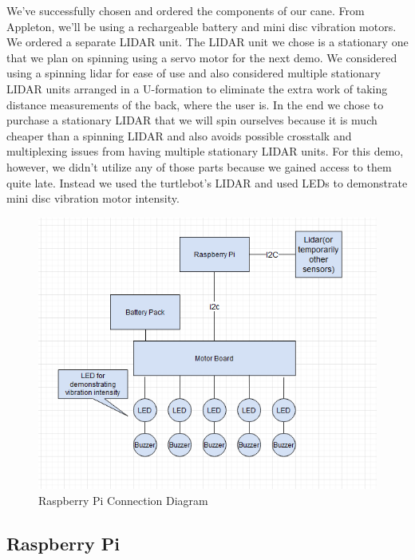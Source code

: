 \documentclass{article}
\begin{document}
We've successfully chosen and ordered the components of our cane. From Appleton, we'll be using a rechargeable battery and mini disc vibration motors. We ordered a separate LIDAR unit. The LIDAR unit we chose is a stationary one that we plan on spinning using a servo motor for the next demo. We considered using a spinning lidar for ease of use and also considered multiple stationary LIDAR units arranged in a U-formation to eliminate the extra work of taking distance measurements of the back, where the user is. In the end we chose to purchase a stationary LIDAR that we will spin ourselves because it is much cheaper than a spinning LIDAR and also avoids possible crosstalk and multiplexing issues from having multiple stationary LIDAR units. For this demo, however, we didn't utilize any of those parts because we gained access to them quite late. Instead we used the turtlebot's LIDAR and used LEDs to demonstrate mini disc vibration motor intensity.

\begin{figure}[tb]
\vskip 5mm
\begin{center}
\centerline{\includegraphics[width=\columnwidth]{figs/hardware-schematic.png}}
\caption{Raspberry Pi Connection Diagram}
\label{fig:hardware-schematic}
\end{center}
\vskip -5mm
\end{figure} 

\subsection{Raspberry Pi}
\end{document}
